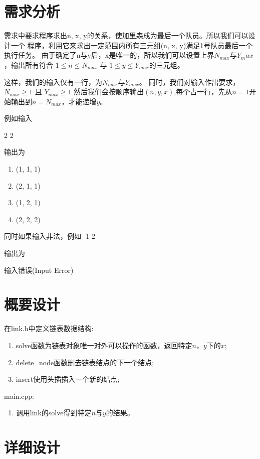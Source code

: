 \section{需求分析}
   需求中要求程序求出n, x, y的关系，使加里森成为最后一个队员。所以我们可以设计一个
程序，利用它来求出一定范围内所有三元组(n, x, y)满足1号队员最后一个执行任务。
由于确定了n与y后，x是唯一的，所以我们可以设置上界$N_{max}$与$Y_max$，输出所有符合
$1 \leqslant n \leqslant  N_{max}$ 与 $1 \leqslant y \leqslant  Y_{max}$的三元组。


这样，我们的输入仅有一行，为$N_{max}$与$Y_{max}$。
同时，我们对输入作出要求，$N_{max} \geqslant 1$ 且 $Y_{max} \geqslant 1$
然后我们会按顺序输出$(n, y, x)$,每个占一行，先从$n = 1$开始输出到$n = N_{max}$，才能递增$y$。

例如输入

   2 2


输出为
\begin{enumerate}
   \item (1, 1, 1)
   \item (2, 1, 1)
   \item (1, 2, 1)
   \item (2, 2, 2)
\end{enumerate}


同时如果输入非法，例如 -1 2


输出为


输入错误(Input Error)

\section{概要设计}
在link.h中定义链表数据结构:
\begin{enumerate}
   \item solve函数为链表对象唯一对外可以操作的函数，返回特定$n$，$y$下的$x$;
   \item delete\_node函数删去链表结点的下一个结点;
   \item insert使用头插插入一个新的结点;
\end{enumerate}


main.cpp:
\begin{enumerate}
   \item 调用link的solve得到特定$n$与$y$的结果。
\end{enumerate}

\section{详细设计}


